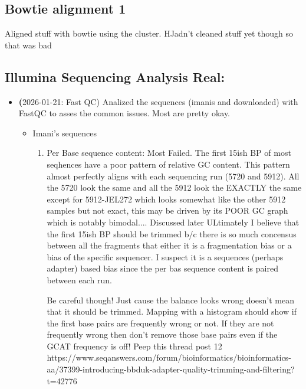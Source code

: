 \documentclass{article}
\begin{document}
        \subsection{Bowtie alignment 1}

        Aligned stuff with bowtie using the cluster.  HJadn't cleaned stuff yet though so that was bad


        \subsection{Illumina Sequencing Analysis Real:}

        \begin{itemize}
            \item \textbf(2026-01-21: Fast QC)  Analized the sequences (imanis and downloaded) with FastQC to asses the common issues.   Most are pretty okay.
            \begin{itemize}
                \item Imani's sequences
                    \begin{enumerate}
                        \item Per Base sequence content:  Most Failed.  The first 15ish BP of most seqhences have a poor pattern of relative GC content.  This pattern almost perfectly aligns with each sequencing run (5720 and 5912).  All the 5720 look the same and all the 5912 look the EXACTLY the same except for 5912-JEL272 which looks somewhat like the other 5912 samples but not exact, this may be driven by its POOR GC graph which is notably bimodal.... Discussed later  ULtimately I believe that the first 15ish BP should be trimmed b/c there is so much concensus between all the fragments that either it is a fragmentation bias or a bias of the specific sequencer.  I suspect it is a sequences (perhaps adapter) based bias since the per bas sequence content is paired between each run.
                        
                        Be careful though!  Just cause the balance looks wrong doesn't mean that it should be trimmed.   Mapping with a histogram should show if the first base pairs are frequently wrong or not.   If they are not frequently wrong then don't remove those base pairs even if the GCAT frequency is off!   Peep this thread post 12 https://www.seqanswers.com/forum/bioinformatics/bioinformatics-aa/37399-introducing-bbduk-adapter-quality-trimming-and-filtering?t=42776


\end{enumerate}
\end{itemize}
\end{itemize}
\end{document}
